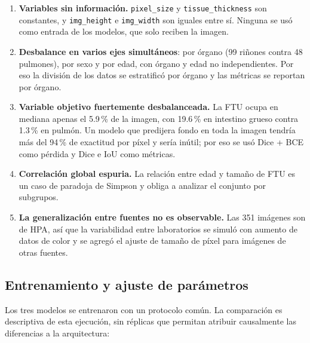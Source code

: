\documentclass[11pt,letterpaper]{article}
\begin{document}
\begin{enumerate}
  \item \textbf{Variables sin información.} \texttt{pixel\_size} y \texttt{tissue\_thickness} son
        constantes, y \texttt{img\_height} e \texttt{img\_width} son iguales entre sí. Ninguna se usó
        como entrada de los modelos, que solo reciben la imagen.
  \item \textbf{Desbalance en varios ejes simultáneos}: por órgano (99 riñones contra 48 pulmones),
        por sexo y por edad, con órgano y edad no independientes. Por eso la división de los datos se
        estratificó por órgano y las métricas se reportan por órgano.
  \item \textbf{Variable objetivo fuertemente desbalanceada.} La FTU ocupa en mediana apenas el
        5.9\,\% de la imagen, con 19.6\,\% en intestino grueso contra 1.3\,\% en pulmón. Un modelo que
        predijera fondo en toda la imagen tendría más del 94\,\% de exactitud por píxel y sería
        inútil; por eso se usó Dice + BCE como pérdida y Dice e IoU como métricas.
  \item \textbf{Correlación global espuria.} La relación entre edad y tamaño de FTU es un caso de
        paradoja de Simpson y obliga a analizar el conjunto por subgrupos.
  \item \textbf{La generalización entre fuentes no es observable.} Las 351 imágenes son de HPA, así que
        la variabilidad entre laboratorios se simuló con aumento de datos de color y se agregó el
        ajuste de tamaño de píxel para imágenes de otras fuentes.
\end{enumerate}

\subsection{Entrenamiento y ajuste de parámetros}

Los tres modelos se entrenaron con un protocolo común. La comparación es descriptiva de esta
ejecución, sin réplicas que permitan atribuir causalmente las diferencias a la arquitectura:
\end{document}
